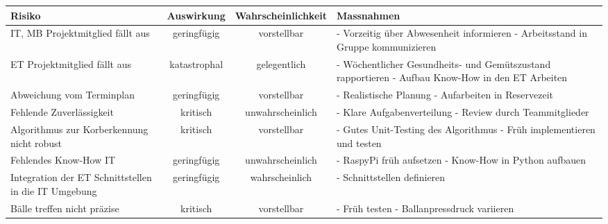 \begin{landscape}
	\begin{table}
		\begin{tabular}{|p{5cm}|c|c|p{9cm}|}
			\hline Risiko & Auswirkung & Wahrscheinlichkeit & Massnahmen \\ 
			
			\hline \rowcolor{yellow} IT, MB Projektmitglied fällt aus & geringfügig & vorstellbar & 
			- Vorzeitig über Abwesenheit informieren \newline
			- Arbeitsstand in Gruppe kommunizieren \\ 
			
			\hline \rowcolor{red} ET Projektmitglied fällt aus & katastrophal & gelegentlich & 
			- Wöchentlicher Gesundheits- und Gemütszustand rapportieren \newline
			- Aufbau Know-How in den ET Arbeiten \\
			
			\hline \rowcolor{yellow} \hline Abweichung vom Terminplan & geringfügig & vorstellbar &
			- Realistische Planung \newline
			- Aufarbeiten in Reservezeit \\ 
			
			\hline \rowcolor{yellow} \hline Fehlende Zuverlässigkeit & kritisch & unwahrscheinlich &
			- Klare Aufgabenverteilung \newline
			- Review durch Teammitglieder \\ 
			
			\hline \rowcolor{yellow} \hline Algorithmus zur Korberkennung nicht robust & kritisch & vorstellbar &
			- Gutes Unit-Testing des Algorithmus \newline
			- Früh implementieren und testen \\
			
			\hline \rowcolor{green} \hline Fehlendes Know-How IT & geringfügig & unwahrscheinlich &
			- RaspyPi früh aufsetzen \newline
			- Know-How in Python aufbauen \\ 
			
			\hline \rowcolor{yellow} \hline Integration der ET Schnittstellen in die IT Umgebung & geringfügig & wahrscheinlich &
			- Schnittstellen definieren  \\
			
			\hline \rowcolor{yellow} \hline Bälle treffen nicht präzise & kritisch & vorstellbar &
			- Früh testen \newline
			- Ballanpressdruck variieren \\ 
			

\end{tabular}
\end{table}
\end{landscape}
